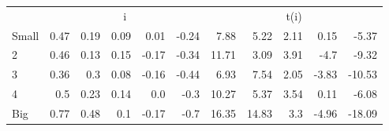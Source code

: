 \begin{table}[!ht]
\begin{tabular}{lrrrrrrrrrr}
  
    
      & \multicolumn{5}{c}{i} & \multicolumn{5}{c}{t(i)}
    
    \\
      \cmidrule(r){2-6} \cmidrule(r){7-11}

    Small   & 0.47  & 0.19  & 0.09  & 0.01  & -0.24  & 7.88  & 5.22  & 2.11  & 0.15  & -5.37  \\
         2  & 0.46  & 0.13  & 0.15  & -0.17  & -0.34  & 11.71  & 3.09  & 3.91  & -4.7  & -9.32  \\
         3  & 0.36  & 0.3  & 0.08  & -0.16  & -0.44  & 6.93  & 7.54  & 2.05  & -3.83  & -10.53  \\
         4  & 0.5  & 0.23  & 0.14  & 0.0  & -0.3  & 10.27  & 5.37  & 3.54  & 0.11  & -6.08  \\
    Big     & 0.77  & 0.48  & 0.1  & -0.17  & -0.7  & 16.35  & 14.83  & 3.3  & -4.96  & -18.09  \\

  

  \bottomrule
\end{tabular}
\label{tbl:25_Size_Beta_FF2016b}
\end{table}